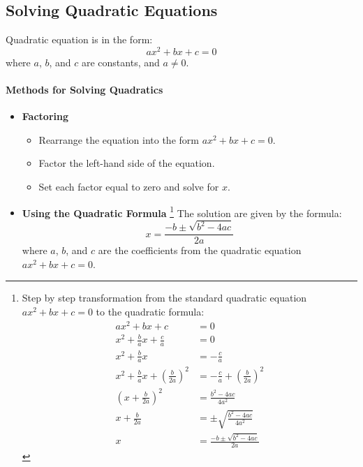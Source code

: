 
\subsection{Solving Quadratic Equations}
Quadratic equation is in the form:
\begin{equation}
    ax^2 + bx + c = 0
\end{equation}
where $a$, $b$, and $c$ are constants, and $a \neq 0$.

\paragraph{Methods for Solving Quadratics}
\begin{itemize}
    \item[1.] \textbf{Factoring}
    \begin{itemize}
        \item Rearrange the equation into the form $ax^2 + bx + c = 0$.
        \item Factor the left-hand side of the equation.
        \item Set each factor equal to zero and solve for $x$.
    \end{itemize}
    \item[2.] \textbf{Using the Quadratic Formula} \footnote{Step by step transformation from the standard quadratic equation
    $ax^2 + bx + c = 0$ to the quadratic formula:
    \begin{equation*}
        \begin{aligned}
            ax^2 + bx + c &= 0 \\
            x^2 + \frac{b}{a}x + \frac{c}{a} &= 0 \\
            x^2 + \frac{b}{a}x &= -\frac{c}{a} \\
            x^2 + \frac{b}{a}x + \left(\frac{b}{2a}\right)^2 &= -\frac{c}{a} + \left(\frac{b}{2a}\right)^2 \\
            \left(x + \frac{b}{2a}\right)^2 &= \frac{b^2 - 4ac}{4a^2} \\
            x + \frac{b}{2a} &= \pm \sqrt{\frac{b^2 - 4ac}{4a^2}} \\
            x &= \frac{-b \pm \sqrt{b^2 - 4ac}}{2a}
        \end{aligned}
    \end{equation*}} The solution are given by the formula:
    \begin{equation}
        x = \frac{-b \pm \sqrt{b^2 - 4ac}}{2a}
    \end{equation}
    where $a$, $b$, and $c$ are the coefficients from the quadratic equation $ax^2 + bx + c = 0$.
\end{itemize}